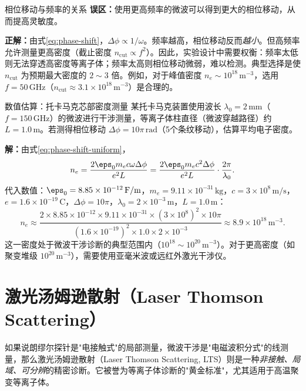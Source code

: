 \begin{warning}{相位移动与频率的关系}{}{}
\textbf{误区：}使用更高频率的微波可以得到更大的相位移动，从而提高灵敏度。

\textbf{正解：}由式\eqref{eq:phase-shift}，$\Delta\phi \propto 1/\omega$。频率越高，相位移动反而\emph{越小}。但高频率允许测量更高密度（截止密度 $n_{\mathrm{cut}} \propto f^2$）。因此，实验设计中需要权衡：频率太低则无法穿透高密度等离子体；频率太高则相位移动微弱，难以检测。典型选择是使 $n_{\mathrm{cut}}$ 为预期最大密度的 $2\sim 3$ 倍。例如，对于峰值密度 $n_e \sim 10^{18}\,\mathrm{m}^{-3}$，选用 $f = 50\,\mathrm{GHz}$（$n_{\mathrm{cut}} \approx 3.1\times 10^{18}\,\mathrm{m}^{-3}$）是合理的。
\end{warning}

\begin{example}{数值估算：托卡马克芯部密度测量}{}{}
某托卡马克装置使用波长 $\lambda_0 = 2\,\mathrm{mm}$（$f = 150\,\mathrm{GHz}$）的微波进行干涉测量，等离子体柱直径（微波穿越路径）约 $L = 1.0\,\mathrm{m}$。若测得相位移动 $\Delta\phi = 10\pi\,\mathrm{rad}$（5个条纹移动），估算平均电子密度。

\textbf{解：}由式\eqref{eq:phase-shift-uniform}，
\begin{equation}
n_e = \frac{2\eps_0 m_e c \omega \Delta\phi}{e^2 L}
= \frac{2\eps_0 m_e c^2 \Delta\phi}{e^2 L} \cdot \frac{2\pi}{\lambda_0}.
\end{equation}
代入数值：$\eps_0 = 8.85\times 10^{-12}\,\mathrm{F/m}$，$m_e = 9.11\times 10^{-31}\,\mathrm{kg}$，$c = 3\times 10^8\,\mathrm{m/s}$，$e = 1.6\times 10^{-19}\,\mathrm{C}$，$\Delta\phi = 10\pi$，$\lambda_0 = 2\times 10^{-3}\,\mathrm{m}$，$L = 1.0\,\mathrm{m}$：
\begin{equation}
n_e \approx \frac{2\times 8.85\times 10^{-12}\times 9.11\times 10^{-31}\times (3\times 10^8)^2 \times 10\pi}{(1.6\times 10^{-19})^2 \times 1.0 \times 2\times 10^{-3}}
\approx 8.9\times 10^{18}\,\mathrm{m}^{-3}.
\end{equation}
这一密度处于微波干涉诊断的典型范围内（$10^{18}\sim 10^{20}\,\mathrm{m}^{-3}$）。对于更高密度（如聚变堆级 $10^{20}\,\mathrm{m}^{-3}$），需要使用亚毫米波或远红外激光干涉仪。
\end{example}


\section{激光汤姆逊散射（Laser Thomson Scattering）}
\label{sec:12.4}

如果说朗缪尔探针是"电接触式"的局部测量，微波干涉是"电磁波积分式"的线测量，那么激光汤姆逊散射（Laser Thomson Scattering, LTS）则是一种\emph{非接触、局域、可分辨}的精密诊断。它被誉为等离子体诊断的"黄金标准"，尤其适用于高温聚变等离子体。

